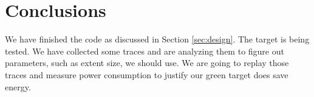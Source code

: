 \section{Conclusions}
\label{sec:conc}

We have finished the code as discussed in Section \ref{sec:design}.
The target is being tested. We have collected some traces and are
analyzing them to figure out parameters, such as extent size, we
should use. We are going to replay those traces and measure power
consumption to justify our green target does save energy.

